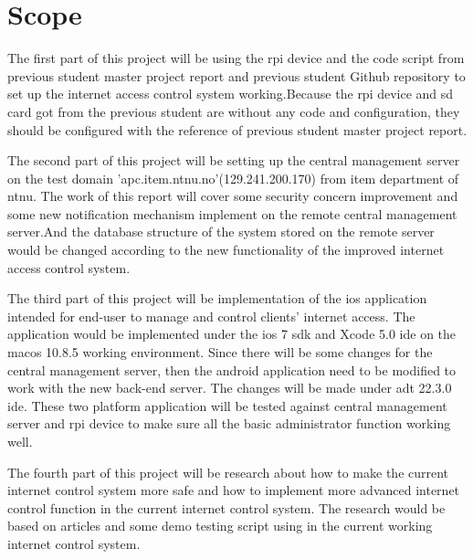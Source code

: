 \section{Scope}
\par The first part of this project will be using the \gls{rpi} device and the code script from previous student master project report\cite{TorgeirMR} and previous student Github repository\cite{TorgierGit} to set up the internet access control system working.Because the \gls{rpi} device and \gls{sd} card  got from the previous student are without any code and configuration, they should be configured with the reference of previous student master project report.
\par The second part of this project will be setting up the central management server on the test domain 'apc.item.ntnu.no'(129.241.200.170)  from \gls{item} department of \gls{ntnu}. The work of this report will cover some security concern improvement and some new notification mechanism implement on the remote central management server.And the database structure of the system stored on the remote server would be changed according to the new functionality of the improved internet access control system.
\par The third part of this project will be implementation of the \gls{ios} application intended for end-user to manage and control clients’ internet access. The application would be implemented under the \gls{ios} 7 \gls{sdk} and Xcode\cite{xcode} 5.0 \gls{ide} on the \gls{macos} 10.8.5 working environment. Since there will be some changes for the central management server, then the android application need to be modified to work with the new back-end server. The changes will be made under \gls{adt}\cite{adt} 22.3.0 \gls{ide}. These two platform application will be tested against central management server and \gls{rpi} device to make sure all the basic administrator function working well.
\par The fourth part of this project will be research about how to make the current internet control system more safe and how to implement more advanced internet control function in the current internet control system. The research would be based on articles and some demo testing script using in the current working internet control system.

